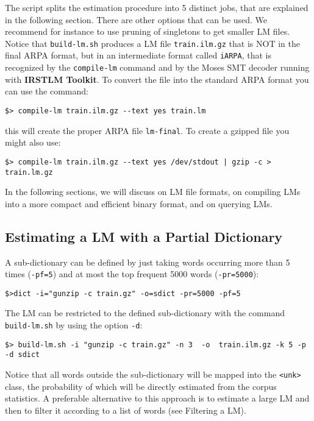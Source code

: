 \documentclass[11pt]{article}
\newcommand{\IRSTLM}{{\bf IRSTLM Toolkit}}
\begin{document}
\noindent
The script splits the estimation procedure into 5 distinct jobs, that are explained in
the following section. There are other options that can be used. We recommend for instance to use pruning of singletons to get smaller LM files. 
Notice that {\tt build-lm.sh} produces a LM file {\tt train.ilm.gz} that is NOT in the final ARPA format, but in
an intermediate format called {\tt iARPA}, that is recognized by the {\tt compile-lm} 
command and by the Moses SMT decoder running with {\IRSTLM}. 
To convert the file into the standard ARPA format you can use the command:

\begin{verbatim}
$> compile-lm train.ilm.gz --text yes train.lm 
\end{verbatim}
this will create the proper ARPA file {\tt lm-final}.
To create a gzipped file you might also use:
\begin{verbatim}
$> compile-lm train.ilm.gz --text yes /dev/stdout | gzip -c > train.lm.gz
\end{verbatim}


\noindent
In the following sections, we will discuss on LM file formats, on compiling LMs into a 
more compact and efficient binary format, and on querying LMs.

\subsection{Estimating a LM with a Partial Dictionary}

A sub-dictionary can be defined by just taking words occurring more than 5 times ({\tt -pf=5})
and at most the top frequent 5000 words ({\tt -pr=5000}):
\begin{verbatim}
$>dict -i="gunzip -c train.gz" -o=sdict -pr=5000 -pf=5 
\end{verbatim}


\noindent
The LM can be restricted to the defined sub-dictionary with the 
command {\tt build-lm.sh} by using the option {\tt -d}: 
\begin{verbatim}
$> build-lm.sh -i "gunzip -c train.gz" -n 3  -o  train.ilm.gz -k 5 -p -d sdict 
\end{verbatim}

\noindent
Notice that all words outside the sub-dictionary will be mapped into the {\tt <unk>}
class, the probability of which will be directly estimated from the corpus statistics.
A preferable alternative to this approach is to estimate a large LM and then to filter
it according to a list of words (see Filtering a LM).
\end{document}
